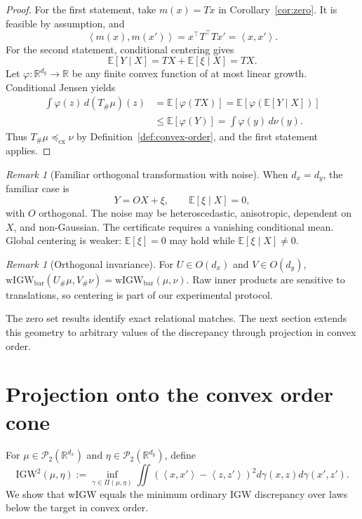 \documentclass[11pt]{article}
\newcommand{\R}{\mathbb R}
\newcommand{\E}{\mathbb E}
\newcommand{\cP}{\mathcal P}
\newcommand{\ip}[2]{\left\langle #1,#2\right\rangle}
\newcommand{\cx}{\preceq_{\mathrm{cx}}}
\newcommand{\wIGW}{\mathrm{wIGW}_{\mathrm{bar}}}
\newcommand{\IGW}{\mathrm{IGW}}
\theoremstyle{plain}
\theoremstyle{definition}
\theoremstyle{remark}
\newtheorem{remark}[theorem]{Remark}
\begin{document}
\begin{proof}
For the first statement, take \(m(x)=Tx\) in Corollary~\ref{cor:zero}. It is
feasible by assumption, and
\[
  \ip{m(x)}{m(x')}=x^\top T^\top Tx'=\ip{x}{x'}.
\]
For the second statement, conditional centering gives
\[
  \E[Y\mid X]=TX+\E[\xi\mid X]=TX.
\]
Let $\varphi:\R^{d_y}\to\R$ be any finite convex function of at most linear
growth. Conditional Jensen yields
\[
\begin{aligned}
  \int\varphi(z)\,d(T_\#\mu)(z)
  &=\E[\varphi(TX)]
   =\E\!\left[\varphi\!\left(\E[Y\mid X]\right)\right]\\
  &\le \E[\varphi(Y)]
   =\int\varphi(y)\,d\nu(y).
\end{aligned}
\]
Thus $T_\#\mu\cx\nu$ by Definition~\ref{def:convex-order}, and the first
statement applies.
\end{proof}

\begin{remark}[Familiar orthogonal transformation with noise]
When $d_x=d_y$, the familiar case is
\[
  Y=OX+\xi,
  \qquad \E[\xi\mid X]=0,
\]
with $O$ orthogonal. The noise may be heteroscedastic, anisotropic, dependent on
$X$, and non-Gaussian. The certificate requires a vanishing conditional mean.
Global centering is weaker: $\E[\xi]=0$ may hold while
$\E[\xi\mid X]\ne0$.
\end{remark}

\begin{remark}[Orthogonal invariance]
For $U\in O(d_x)$ and $V\in O(d_y)$,
\(\wIGW(U_\#\mu,V_\#\nu)=\wIGW(\mu,\nu)\). Raw inner products are sensitive to
translations, so centering is part of our experimental protocol.
\end{remark}

The zero set results identify exact relational matches. The next section extends
this geometry to arbitrary values of the discrepancy through projection in convex
order.

\section{Projection onto the convex order cone}\label{sec:projection}

For \(\mu\in\cP_2(\R^{d_x})\) and \(\eta\in\cP_2(\R^{d_y})\), define
\begin{equation}\label{eq:projection-igw-objective}
  \IGW^2(\mu,\eta):=\inf_{\gamma\in\Pi(\mu,\eta)}
  \iint\left(\ip{x}{x'}-\ip{z}{z'}\right)^2
  d\gamma(x,z)d\gamma(x',z').
\end{equation}
We show that wIGW equals the minimum ordinary IGW discrepancy over laws below the
target in convex order.
\end{document}
